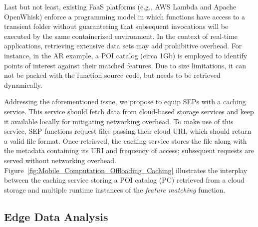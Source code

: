 \documentclass[letterpaper, 10 pt, conference]{ieeeconf}  %
\begin{document}
Last but not least, existing FaaS platforms (e.g., AWS Lambda and Apache OpenWhisk) enforce a programming model in which functions have access to a transient folder without guaranteeing that subsequent invocations will be executed by the same containerized environment. %
In the context of real-time applications, retrieving extensive data sets may add prohibitive overhead. For instance, in the AR example, a POI catalog (circa 1Gb) is employed to identify points of interest against their matched features. Due to size limitations, it can not be packed with the function source code, but needs to be retrieved dynamically.

Addressing the aforementioned issue, we propose to equip SEPs with a caching service. This service should fetch data from cloud-based storage services and keep it available locally for mitigating networking overhead. 
To make use of this service, SEP functions request files passing their cloud URI, which should return a valid file format.
Once retrieved, the caching service stores the file along with the metadata containing its URI and frequency of access; subsequent requests are served without networking overhead. 
Figure~\ref{fig:Mobile_Computation_Offloading_Caching} illustrates the interplay between the caching service storing a POI catalog (PC) retrieved from a cloud storage and multiple runtime instances of the \textit{feature matching} function.



\subsection{Edge Data Analysis}
\end{document}
